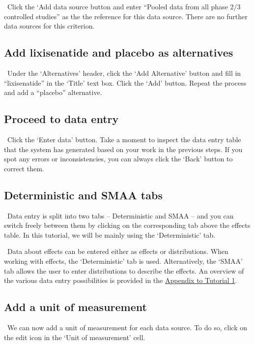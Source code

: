 \documentclass[00_mcda_tutorial.tex]{subfiles}
\begin{document}
\noindent \leftpointright \, Click the ‘Add data source button and enter “Pooled data from all phase 2/3 controlled studies” as the the reference for this data source.  There are no further data sources for this criterion.

\subsection*{Add lixisenatide and placebo as alternatives}
\noindent \leftpointright \, Under the ‘Alternatives’ header, click the ‘Add Alternative’ button and fill in “lixisenatide” in the ‘Title’ text box. Click the ‘Add’ button. Repeat the process and add a “placebo” alternative.

\subsection*{Proceed to data entry}
\noindent \leftpointright \, Click the ‘Enter data’ button. Take a moment to inspect the data entry table that the system has generated based on your work in the previous steps. If you spot any errors or inconsistencies, you can always click the ‘Back’ button to correct them.

\subsection*{Deterministic and SMAA tabs}
\noindent \faLightbulbO \, Data entry is split into two tabs – Deterministic and SMAA – and you can switch freely between them by clicking on the corresponding tab above the effects table. In this tutorial, we will be mainly using the ‘Deterministic’ tab.
\newline

\noindent \faGraduationCap \, Data about effects can be entered either as effects or distributions. When working with effects, the ‘Deterministic’ tab is used. Alternatively, the ‘SMAA’ tab allows the user to enter distributions to describe the effects. An overview of the various data entry possibilities is provided in the \hyperref[appendix1]{Appendix to Tutorial 1}.

\subsection*{Add a unit of measurement}
\noindent \leftpointright \, We can now add a unit of measurement for each data source. To do so, click on the edit icon in the ‘Unit of measurement’ cell.
\newline
\end{document}
